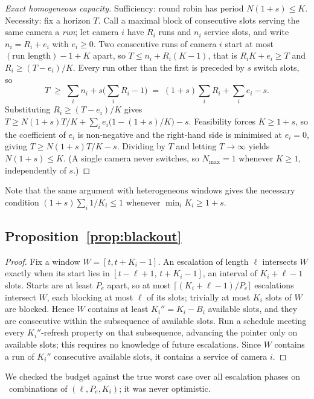 \documentclass[final,5p,times,twocolumn]{elsarticle}
\theoremstyle{definition}
\newcommand{\Nc}{N}
\newcommand{\Ki}{K_i}
\begin{document}
\begin{proof}[Exact homogeneous capacity]
Sufficiency: round robin has period $\Nc(1+s)\le K$. Necessity: fix a horizon $T$. Call a maximal
block of consecutive slots serving the same camera a \emph{run}; let camera $i$ have $R_i$ runs
and $n_i$ service slots, and write $n_i=R_i+e_i$ with $e_i\ge0$. Two consecutive runs of camera
$i$ start at most $(\text{run length}) - 1 + K$ apart, so $T\le n_i+R_i(K-1)$, that is
$R_iK+e_i\ge T$ and $R_i\ge(T-e_i)/K$. Every run other than the first is preceded by $s$ switch
slots, so
\[
T\;\ge\;\sum_i n_i+s\Big(\sum_i R_i-1\Big)\;=\;(1+s)\sum_i R_i+\sum_i e_i-s .
\]
Substituting $R_i\ge(T-e_i)/K$ gives
$T\ge \Nc(1+s)T/K+\sum_i e_i\big(1-(1+s)/K\big)-s$. Feasibility forces $K\ge 1+s$, so the
coefficient of $e_i$ is non-negative and the right-hand side is minimised at $e_i=0$, giving
$T\ge \Nc(1+s)T/K-s$. Dividing by $T$ and letting $T\to\infty$ yields $\Nc(1+s)\le K$. (A single
camera never switches, so $N_{\max}=1$ whenever $K\ge1$, independently of $s$.)
\end{proof}

\noindent
Note that the same argument with heterogeneous windows gives the necessary condition
$(1+s)\sum_i 1/\Ki\le1$ whenever $\min_i \Ki\ge 1+s$.

\subsection*{Proposition~\ref{prop:blackout}}
\begin{proof}
Fix a window $W=[t,t+\Ki-1]$. An escalation of length $\ell$ intersects $W$ exactly when its start
lies in $[t-\ell+1,\,t+\Ki-1]$, an interval of $\Ki+\ell-1$ slots. Starts are at least $P_e$ apart,
so at most $\lceil(\Ki+\ell-1)/P_e\rceil$ escalations intersect $W$, each blocking at most $\ell$
of its slots; trivially at most $\Ki$ slots of $W$ are blocked. Hence $W$ contains at least
$K_i''=\Ki-B_i$ available slots, and they are consecutive within the subsequence of available
slots. Run a schedule meeting every $K_i''$-refresh property on that subsequence, advancing the
pointer only on available slots; this requires no knowledge of future escalations. Since $W$
contains a run of $K_i''$ consecutive available slots, it contains a service of camera $i$.
\end{proof}

\noindent
We checked the budget against the true worst case over all escalation phases on
\numCfiveCells\ combinations of $(\ell,P_e,\Ki)$; it was never optimistic.
\end{document}
